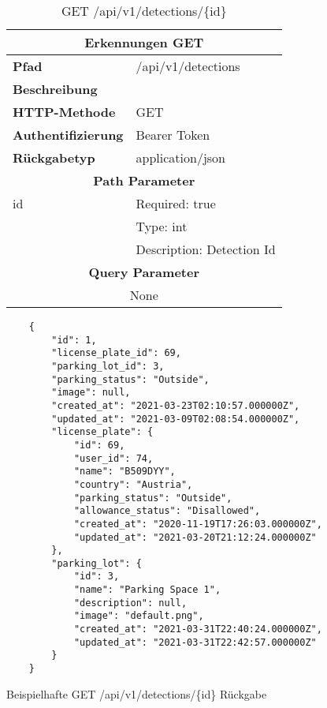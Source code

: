 \begin{table}[H]
  \centering
  \begin{tabular}{|l|l|}
  \hline
  \multicolumn{2}{|c|}{\textbf{Erkennungen GET}}         \\ \hline
  \textbf{Pfad}              & /api/v1/detections        \\ \hline
  \textbf{Beschreibung}      &                           \\ \hline
  \textbf{HTTP-Methode}      & GET                       \\ \hline
  \textbf{Authentifizierung} & Bearer Token              \\ \hline
  \textbf{Rückgabetyp}       & application/json          \\ \hline
  \multicolumn{2}{|c|}{\textbf{Path Parameter}}          \\ \hline
  id                         & Required: true            \\ \hline
                             & Type: int                 \\ \hline
                             & Description: Detection Id \\ \hline
  \multicolumn{2}{|c|}{\textbf{Query Parameter}}                      \\ \hline
  \multicolumn{2}{|c|}{None}          \\ \hline
  \end{tabular}
  \caption{GET /api/v1/detections/\{id\}}
\end{table}

\begin{listing}[H]
  \begin{verbatim}
    {
        "id": 1,
        "license_plate_id": 69,
        "parking_lot_id": 3,
        "parking_status": "Outside",
        "image": null,
        "created_at": "2021-03-23T02:10:57.000000Z",
        "updated_at": "2021-03-09T02:08:54.000000Z",
        "license_plate": {
            "id": 69,
            "user_id": 74,
            "name": "B509DYY",
            "country": "Austria",
            "parking_status": "Outside",
            "allowance_status": "Disallowed",
            "created_at": "2020-11-19T17:26:03.000000Z",
            "updated_at": "2021-03-20T21:12:24.000000Z"
        },
        "parking_lot": {
            "id": 3,
            "name": "Parking Space 1",
            "description": null,
            "image": "default.png",
            "created_at": "2021-03-31T22:40:24.000000Z",
            "updated_at": "2021-03-31T22:42:57.000000Z"
        }
    }
  \end{verbatim}
  \caption{Beispielhafte GET /api/v1/detections/\{id\} Rückgabe}
\end{listing}

